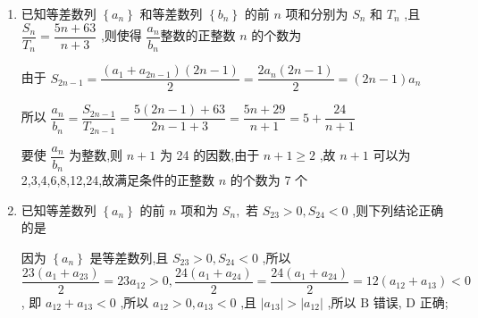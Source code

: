 \begin{enumerate}
    \item 已知等差数列 $\left\{  {a}_{n}\right\}$ 和等差数列 $\left\{  {b}_{n}\right\}$ 的前 $n$ 项和分别为 ${S}_{n}$ 和 ${T}_{n}$ ,且 $\dfrac{{S}_{n}}{T_n} = \dfrac{{5n} + {63}}{n + 3}$ ,则使得 $\dfrac{a_n}{b_n}$整数的正整数 $n$ 的个数为 
    \begin{jieda}
        由于 ${S}_{{2n} - 1} = \dfrac{\left( {{a}_{1} + {a}_{{2n} - 1}}\right) \left( {{2n} - 1}\right) }{2} = \dfrac{2{a}_{n}\left( {{2n} - 1}\right) }{2} = \left( {{2n} - 1}\right) {a}_{n}$
        
        所以 $\dfrac{{a}_{n}}{{b}_{n}} = \dfrac{{S}_{{2n} - 1}}{{T}_{{2n} - 1}} = \dfrac{5\left( {{2n} - 1}\right)  + {63}}{{2n} - 1 + 3} = \dfrac{{5n} + {29}}{n + 1} = 5 + \dfrac{24}{n + 1}$ 
        
        要使 $\dfrac{{a}_n}{b_n}$ 为整数,则 $n + 1$ 为 24 的因数,由于 $n + 1 \geq  2$ ,故 $n + 1$ 可以为2,3,4,6,8,12,24,故满足条件的正整数 $n$ 的个数为 7 个
    \end{jieda}

    \item 已知等差数列 $\left\{  {a}_{n}\right\}$ 的前 $n$ 项和为 ${S}_{n},$ 若 ${S}_{23} > 0,{S}_{24} < 0$ ,则下列结论正确的是 
    \begin{jieda}
        因为 $\left\{  {a}_{n}\right\}$ 是等差数列,且 ${S}_{23} > 0,{S}_{24} < 0$ ,所以 $\dfrac{{23}\left( {{a}_{1} + {a}_{23}}\right) }{2} = {23}{a}_{12} > 0,\dfrac{{24}\left( {{a}_{1} + {a}_{24}}\right) }{2} = \dfrac{{24}\left( {{a}_{1} + {a}_{24}}\right) }{2} = {12}\left( {{a}_{12} + {a}_{13}}\right)  < 0$ ,
        即 ${a}_{12} + {a}_{13} < 0$ ,所以 ${a}_{12} > 0,{a}_{13} < 0$ ,且 $\left| {a}_{13}\right|  > \left| {a}_{12}\right|$ ,所以 $\mathrm{B}$ 错误, $\mathrm{D}$ 正确;
        

\end{jieda}
\end{enumerate}
